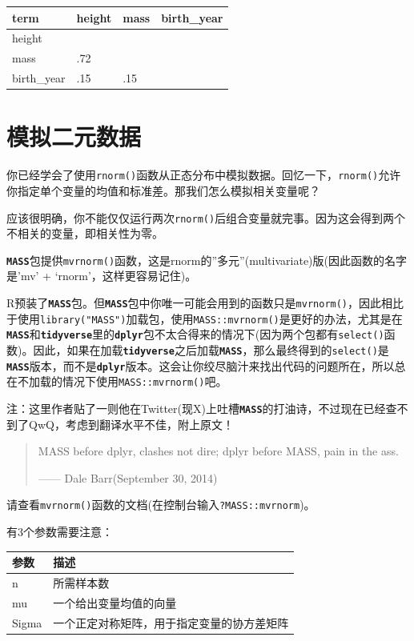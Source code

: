 \documentclass[
]{book}
\begin{document}
\begin{tabular}{l|l|l|l}
\hline
term & height & mass & birth\_year\\
\hline
height &  &  & \\
\hline
mass & .72 &  & \\
\hline
birth\_year & .15 & .15 & \\
\hline
\end{tabular}

\hypertarget{ux6a21ux62dfux4e8cux5143ux6570ux636e}{%
\section{模拟二元数据}\label{ux6a21ux62dfux4e8cux5143ux6570ux636e}}

你已经学会了使用\texttt{rnorm()}函数从正态分布中模拟数据。回忆一下，\texttt{rnorm()}允许你指定单个变量的均值和标准差。那我们怎么模拟相关变量呢？

应该很明确，你不能仅仅运行两次\texttt{rnorm()}后组合变量就完事。因为这会得到两个不相关的变量，即相关性为零。

\textbf{\texttt{MASS}}包提供\texttt{mvrnorm()}函数，这是rnorm的''多元''(multivariate)版(因此函数的名字是'mv' + `rnorm'，这样更容易记住)。

R预装了\textbf{\texttt{MASS}}包。但\textbf{\texttt{MASS}}包中你唯一可能会用到的函数只是\texttt{mvrnorm()}，因此相比于使用\texttt{library("MASS")}加载包，使用\texttt{MASS::mvrnorm()}是更好的办法，尤其是在\textbf{\texttt{MASS}}和\textbf{\texttt{tidyverse}}里的\textbf{\texttt{dplyr}}包不太合得来的情况下(因为两个包都有\texttt{select()}函数)。因此，如果在加载\textbf{\texttt{tidyverse}}之后加载\textbf{\texttt{MASS}}，那么最终得到的\texttt{select()}是\textbf{\texttt{MASS}}版本，而不是\textbf{\texttt{dplyr}}版本。这会让你绞尽脑汁来找出代码的问题所在，所以总在不加载的情况下使用\texttt{MASS::mvrnorm()}吧。

注：这里作者贴了一则他在Twitter(现X)上吐槽\textbf{\texttt{MASS}}的打油诗，不过现在已经查不到了QwQ，考虑到翻译水平不佳，附上原文！

\begin{quote}
MASS before dplyr, clashes not dire; dplyr before MASS, pain in the ass.

------ Dale Barr(September 30, 2014)
\end{quote}

请查看\texttt{mvrnorm()}函数的文档(在控制台输入\texttt{?MASS::mvrnorm})。

有3个参数需要注意：

\begin{longtable}[]{@{}ll@{}}
\toprule\noalign{}
参数 & 描述 \\
\midrule\noalign{}
\endhead
\bottomrule\noalign{}
\endlastfoot
n & 所需样本数 \\
mu & 一个给出变量均值的向量 \\
Sigma & 一个正定对称矩阵，用于指定变量的协方差矩阵 \\
\end{longtable}
\end{document}
